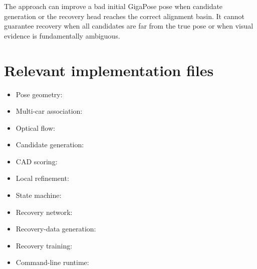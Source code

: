 \documentclass[11pt]{article}
\begin{document}
The approach can improve a bad initial GigaPose pose when candidate generation
or the recovery head reaches the correct alignment basin. It cannot guarantee
recovery when all candidates are far from the true pose or when visual
evidence is fundamentally ambiguous.

\section{Relevant implementation files}

\begin{itemize}
    \item Pose geometry: 
    \item Multi-car association: 
    \item Optical flow: 
    \item Candidate generation: 
    \item CAD scoring: 
    \item Local refinement: 
    \item State machine: 
    \item Recovery network: 
    \item Recovery-data generation:
    \item Recovery training: 
    \item Command-line runtime: 
\end{itemize}
\end{document}
